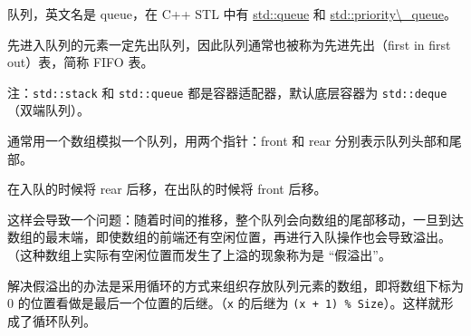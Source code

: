
队列，英文名是 queue，在 C++ STL 中有 \href{https://en.cppreference.com/w/cpp/container/queue}{std::queue} 和 \href{https://en.cppreference.com/w/cpp/container/priority_queue}{std::priority\textbackslash{}\_queue}。

先进入队列的元素一定先出队列，因此队列通常也被称为先进先出（first in first out）表，简称 FIFO 表。

注：\texttt{std::stack} 和 \texttt{std::queue} 都是容器适配器，默认底层容器为 \texttt{std::deque}（双端队列）。

通常用一个数组模拟一个队列，用两个指针：front 和 rear 分别表示队列头部和尾部。

在入队的时候将 rear 后移，在出队的时候将 front 后移。

这样会导致一个问题：随着时间的推移，整个队列会向数组的尾部移动，一旦到达数组的最末端，即使数组的前端还有空闲位置，再进行入队操作也会导致溢出。（这种数组上实际有空闲位置而发生了上溢的现象称为是 “假溢出”。

解决假溢出的办法是采用循环的方式来组织存放队列元素的数组，即将数组下标为 0 的位置看做是最后一个位置的后继。（\texttt{x} 的后继为 \texttt{(x + 1) \% Size}）。这样就形成了循环队列。
